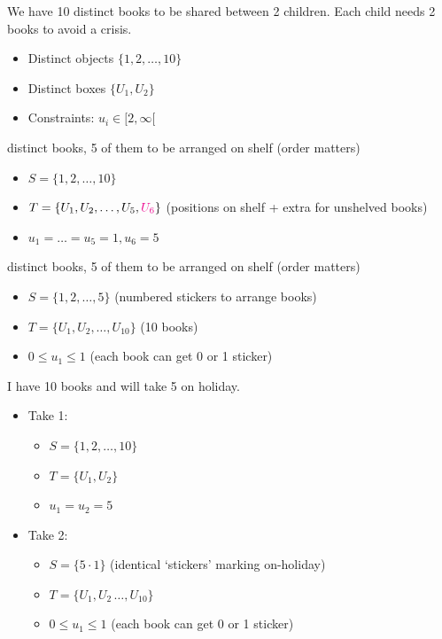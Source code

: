 \documentclass[12pt]{article}
\begin{document}
\eg We have 10 distinct books to be shared between 2 children. Each child needs 2 books to avoid a crisis.
\begin{itemize}
    \item Distinct objects $\{1,2,\dots,10\}$
    \item Distinct boxes $\{U_1,U_2\}$
    \item Constraints: $u_i\in [2,\infty[$
\end{itemize}

 distinct books, 5 of them to be arranged on shelf (order matters)
\begin{itemize}
    \item $S=\{1,2,\dots,10\}$
    \item $T=\{U_1,U_2,\dots,U_5, \textcolor{magenta}{U_6}\}$ (positions on shelf + extra for unshelved books)
    \item $u_1=\dots=u_5=1, u_6=5$
\end{itemize}

 distinct books, 5 of them to be arranged on shelf (order matters)
\begin{itemize}
    \item $S=\{1,2,\dots,5\}$ (numbered stickers to arrange books)
    \item $T=\{U_1,U_2,\dots,U_{10}\}$ (10 books)
    \item $0\leq u_1\leq 1$ (each book can get 0 or 1 sticker)
\end{itemize}

\eg I have 10 books and will take 5 on holiday.
\begin{itemize}
    \item Take 1: \begin{itemize}
        \item $S=\{1,2,\dots,10\}$
        \item $T=\{U_1,U_2\}$
        \item $u_1=u_2=5$
    \end{itemize}
    \item Take 2: \begin{itemize}
        \item $S=\{5\cdot 1\}$ (identical `stickers' marking on-holiday)
        \item $T=\{U_1,U_2\,\dots,U_{10}\}$
        \item $0\leq u_1\leq 1$ (each book can get 0 or 1 sticker)
    \end{itemize}
\end{itemize}
\end{document}
